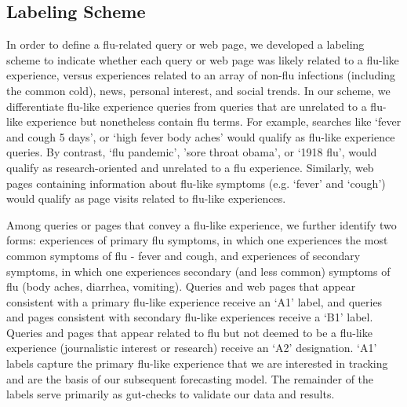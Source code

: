 \documentclass[12pt]{article}
\begin{document}
\subsection{Labeling Scheme}

In order to define a flu-related query or web page, we developed a labeling scheme to indicate whether each query or web page was likely related to a flu-like experience, versus experiences related to an array of non-flu infections (including the common cold), news, personal interest, and social trends. In our scheme, we differentiate flu-like experience queries from queries that are unrelated to a flu-like experience but nonetheless contain flu terms. For example, searches like `fever and cough 5 days', or `high fever body aches' would qualify as flu-like experience queries. By contrast, `flu pandemic', 'sore throat obama', or `1918 flu', would qualify as research-oriented and unrelated to a flu experience. Similarly, web pages containing information about flu-like symptoms (e.g. `fever' and `cough') would qualify as page visits related to flu-like experiences. 

Among queries or pages that convey a flu-like experience, we further identify two forms: experiences of primary flu symptoms, in which one experiences the most common symptoms of flu  - fever and cough, and experiences of secondary symptoms, in which one experiences secondary (and less common) symptoms of flu (body aches, diarrhea, vomiting). Queries and web pages that appear consistent with a primary flu-like experience receive an `A1' label, and queries and pages consistent with secondary flu-like experiences receive a `B1' label. Queries and pages that appear related to flu but not deemed to be a flu-like experience (journalistic interest or research) receive an `A2' designation. `A1' labels capture the primary flu-like experience that we are interested in tracking and are the basis of our subsequent forecasting model. The remainder of the labels serve primarily as gut-checks to validate our data and results. 
\end{document}
